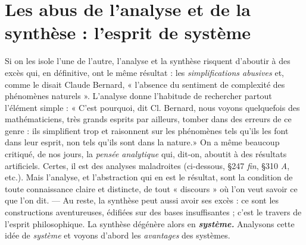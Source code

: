 \section{Les abus de l'analyse et de la synthèse : l’esprit de
système}%
Si on les isole l’une de l’autre, l’analyse et la synthèse
risquent d’aboutir à des excès qui, en définitive, ont le même résultat :
les {\it simplifications abusives} et, comme le disait Claude Bernard,
« l’absence du sentiment de complexité des phénomènes naturels ».
L’analyse donne l’habitude de rechercher partout l’élément simple :
« C’est pourquoi, dit Cl. Bernard, nous voyons quelquefois des mathématiciens,
très grands esprits par ailleurs, tomber dans des erreurs
de ce genre : ils simplifient trop et raisonnent sur les phénomènes
tels qu’ils les font dans leur esprit, non tels qu’ils sont dans la nature.»
On a même beaucoup critiqué, de nos jours, la {\it pensée analytique} qui,
dit-on, aboutit à des résultats artificiels. Certes, il est des analyses
maladroites (ci-dessous, \S 247 {\it fin}, \S 310 {\it A}, etc.). Mais l’analyse, et
l’abstraction qui en est le résultat, sont la condition de toute connaissance
claire et distincte, de tout « discours » où l’on veut savoir ce que
l’on dit. — Au reste, la synthèse peut aussi avoir ses excès : ce sont
les constructions aventureuses, édifiées sur des bases insuffisantes ;
c’est le travers de l’esprit philosophique. La synthèse dégénère alors
en \textbf{\textit {système.}} Analysons cette idée de {\it système} et voyons d’abord les
{\it avantages} des systèmes.

